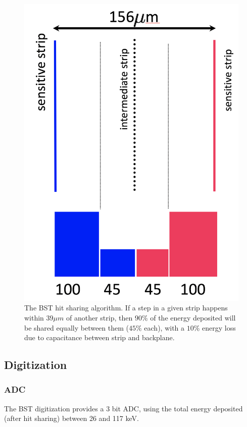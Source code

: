 \begin{figure}
	\centering
	\includegraphics[width=0.95\columnwidth,keepaspectratio]{img/bstHitSharing.png}
	\caption{The BST hit sharing algorithm. If a step in a given strip happens within $39 \mu m$ of another strip, then
            $90\%$ of the energy deposited will be shared equally between them ($45\%$ each), with a $10\%$ energy loss due
	         to capacitance between strip and backplane.}
	\label{fig:bstHitSharing}
\end{figure}


\subsection{Digitization}

\subsubsection{ADC}
The BST digitization provides a 3 bit ADC, using the total energy deposited (after hit sharing) between 26 and 117 keV.

